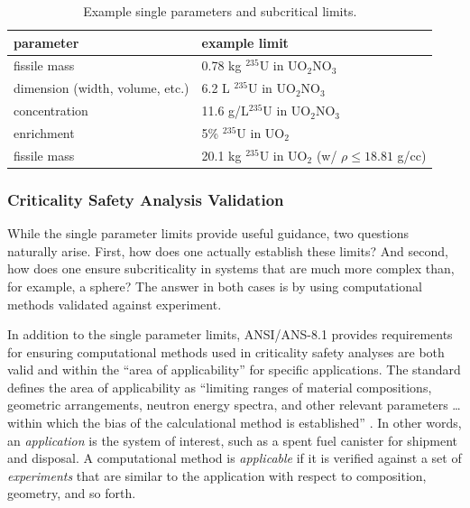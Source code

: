 \begin{table}[ht]
    \caption{Example single parameters and subcritical limits.}
    \begin{center} 
    \begin{tabular*}{0.90\textwidth}{@{\extracolsep{\fill}} ll } 
      \toprule 
	parameter &  example limit \\
      \midrule
       fissile mass                    &  0.78 kg ${}^{235}$U in UO$_2$NO$_3$ \\
       dimension (width, volume, etc.) &  6.2   L ${}^{235}$U in UO$_2$NO$_3$ \\
       concentration                   &  11.6 g/L${}^{235}$U in UO$_2$NO$_3$ \\
       enrichment                      &  5\%     ${}^{235}$U in UO$_2$       \\
       fissile mass                    &  20.1 kg ${}^{235}$U in UO$_2$ 
                                          (w/ $\rho \leq 18.81$ g/cc) \\
      \bottomrule 
    \end{tabular*} 
    \end{center} 
    \label{tbl:controlparams}
\end{table}



\subsubsection*{Criticality Safety Analysis Validation}

While the single parameter limits provide useful guidance, two questions 
naturally arise.  First, how does one actually establish these limits?  And 
second, how does one ensure subcriticality in systems that are much more 
complex than, for example, a sphere?  The answer in both cases is by using 
computational methods validated against experiment.

In addition to the single parameter limits, ANSI/ANS-8.1 provides 
requirements for ensuring computational methods used in criticality safety 
analyses are both valid and within the ``area of applicability'' for specific 
applications. The standard defines the area of applicability as ``limiting 
ranges of material compositions, geometric arrangements, neutron energy 
spectra, and other relevant parameters \ldots within which the bias of the 
calculational method is established'' \cite{ans8_1}.  In other words, an 
\textit{application} is the system of interest, such as a spent fuel canister 
for shipment and disposal. A computational method is \textit{applicable} if 
it is verified against a set of \textit{experiments} that are similar to the 
application with respect to composition, geometry, and so forth.


